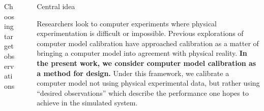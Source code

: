 \documentclass[final]{beamer}
\newlength{\sepwid}
\newlength{\onecolwid}
\newlength{\twocolwid}
\begin{document}
\begin{frame}[t]
\begin{columns}[t]
\begin{column}{\onecolwid}
\begin{alertblock}{Choosing target observations}
\end{alertblock}





%
%
%
%


\end{column} %



\begin{column}{\sepwid}\end{column} %

\begin{column}{\twocolwid} %


\begin{alertblock}{Central idea}

Researchers look to computer experiments where physical experimentation is difficult or impossible\cite{Sacks1989,Santner2003a}. Previous explorations of computer model calibration have approached calibration as a matter of bringing a computer model into agreement with physical reality\cite{Bayarri2007,Kennedy2001,Higdon2004,Williams2006}. \textbf{In the present work, we consider computer model calibration as a method for design.} Under this framework, we calibrate a computer model not using physical experimental data, but rather using ``desired observations'' which describe the performance one hopes to achieve in the simulated system. 


\end{alertblock}
\end{column}
\end{columns}
\end{frame}
\end{document}
